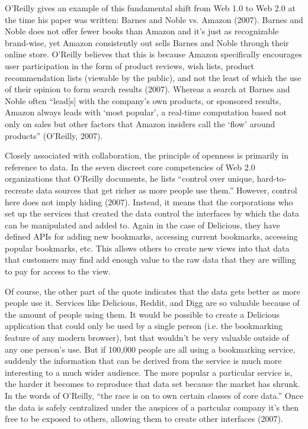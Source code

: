 \documentclass[12pt,oneside,letterpaper]{article}
\begin{document}
O'Reilly gives an example of this fundamental shift from Web 1.0 to Web 2.0 at
the time his paper was written: Barnes and Noble vs. Amazon (2007).  Barnes and
Noble does not offer fewer books than Amazon and it's just as recognizable
brand-wise, yet Amazon consistently out sells Barnes and Noble through their
online store.  O'Reilly believes that this is because Amazon specifically
encourages user participation in the form of product reviews, wish lists,
product recommendation lists (viewable by the public), and not the least of
which the use of their opinion to form search results (2007).  Whereas a search
at Barnes and Noble often ``lead[s] with the company's own products, or sponsored
results, Amazon always leads with `most popular', a real-time computation based
not only on sales but other factors that Amazon insiders call the `flow' around
products'' (O'Reilly, 2007).

Closely associated with collaboration, the principle of openness is primarily in
reference to data.  In the seven discreet core competencies of Web 2.0
organizations that O'Reilly documents, he lists ``control over unique,
hard-to-recreate data sources that get richer as more people use them.''
However, control here does not imply hiding (2007).  Instead, it means that the
corporations who set up the services that created the data control the
interfaces by which the data can be manipulated and added to. Again in the case
of Delicious, they have defined APIs for adding new bookmarks, accessing current
bookmarks, accessing popular bookmarks, etc.  This allows others to create new
views into that data that customers may find add enough value to the raw data
that they are willing to pay for access to the view.

Of course, the other part of the quote indicates that the data gets better as
more people use it.  Services like Delicious, Reddit, and Digg are so valuable
because of the amount of people using them.  It would be possible to create a
Delicious application that could only be used by a single person (i.e. the
bookmarking feature of any modern browser), but that wouldn't be very valuable
outside of any one person's use.  But if 100,000 people are all using a
bookmarking service, suddenly the information that can be derived from the
service is much more interesting to a much wider audience.  The more popular a
particular service is, the harder it becomes to reproduce that data set because
the market has shrunk.  In the words of O'Reilly, ``the race is on to own certain
classes of core data.''  Once the data is safely centralized under the auspices
of a partcular company it's then free to be exposed to others, allowing them to
create other interfaces (2007).
\end{document}
